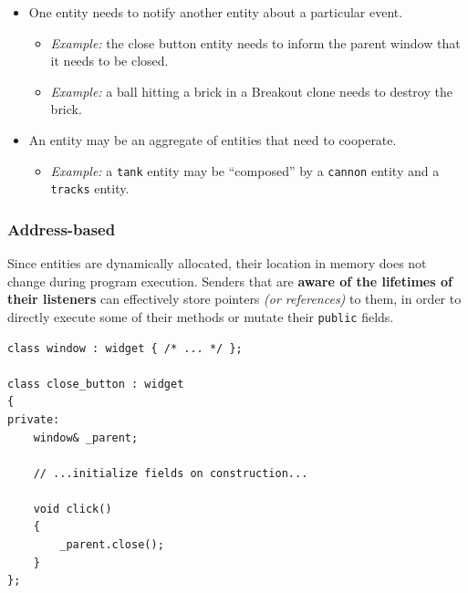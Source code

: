 \documentclass[oneside, 12pt, a4paper, openany]{book}
\providecommand{\tightlist}{%
  \setlength{\itemsep}{0pt}\setlength{\parskip}{0pt}}
\begin{document}
\begin{itemize}
\item
  One entity needs to notify another entity about a particular event.

  \begin{itemize}
  \item
    \emph{Example:} the close button entity needs to inform the parent
    window that it needs to be closed.
  \item
    \emph{Example:} a ball hitting a brick in a Breakout clone needs to
    destroy the brick.
  \end{itemize}
\item
  An entity may be an aggregate of entities that need to cooperate.

  \begin{itemize}
  \tightlist
  \item
    \emph{Example:} a
    \texttt{tank}
    entity may be ``composed'' by a
    \texttt{cannon}
    entity and a
    \texttt{tracks}
    entity.
  \end{itemize}
\end{itemize}

\subsubsection{Address-based}\label{address-based}

Since entities are dynamically allocated, their location in memory does
not change during program execution. Senders that are \textbf{aware of
the lifetimes of their listeners} can effectively store pointers
\emph{(or references)} to them, in order to directly execute some of
their methods or mutate their
\texttt{public}
fields.

\begin{verbatim}
class window : widget { /* ... */ };

class close_button : widget
{
private:
    window& _parent;

    // ...initialize fields on construction...

    void click()
    {
        _parent.close();
    }
};
\end{verbatim}
\end{document}
